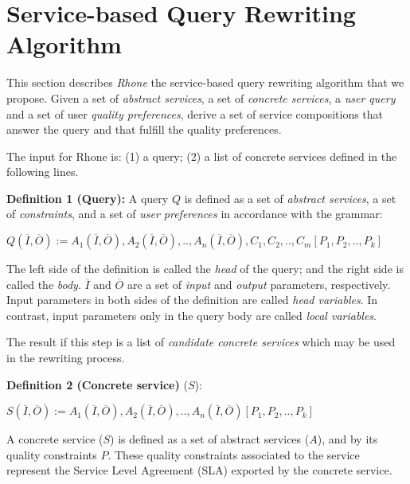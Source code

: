 \section{Service-based Query Rewriting Algorithm}
\label{sec:rhone} 
This section describes \textit{Rhone} the service-based query rewriting algorithm that we propose. Given
a set of \textit{abstract services}, a set of \textit{concrete services}, a
\textit{user query} and a set of user \textit{quality preferences}, derive a set
of service compositions that answer the query and that fulfill the quality preferences.

The  input for  Rhone  is: (1) a query; (2) a list of concrete services defined in the following lines.

\bigskip
\noindent \textbf{Definition 1 (Query):} 
A query $Q$ is defined as a set of \textit{abstract services}, a set of \textit{constraints}, and a set of \textit{user preferences} in accordance with the grammar: 
\begin{center}
$Q (\overline{I}, \overline{O}) := A_{1}(\overline{I}, \overline{O}), A_{2}(\overline{I}, \overline{O}), ..,  A_{n}(\overline{I}, \overline{O}),C_{1},C_{2}, .., C_{m}[P_{1},P_{2}, .., P_{k}]$
\end{center}  

The left side of the definition is called the \textit{head} of the query; and the right side is called the \textit{body}. 
$\overline{I}$ and $\overline{O}$ are a set of \textit{input} and \textit{output} parameters, respectively.
Input parameters in both sides of the definition are called \textit{head variables}.
In contrast, input parameters only in the query body are called \textit{local variables}.

The result if this step is a list of \textit{candidate concrete services} which
 may be used in the rewriting process.

\bigskip
\noindent \textbf{Definition 2 (Concrete service)}  ($S$):
\begin{center}
$S (\overline{I}, \overline{O}) := A_{1}(\overline{I}, \overline{O}), A_{2}(\overline{I}, \overline{O}), ..,  A_{n}(\overline{I}, \overline{O})[P_{1},P_{2}, .., P_{k}]$
\end{center}  

A concrete service ($S$) is defined as a set of abstract services ($A$), and by its quality constraints $P$. 
These quality constraints associated to the service represent the Service Level Agreement (SLA) exported by the concrete service.


